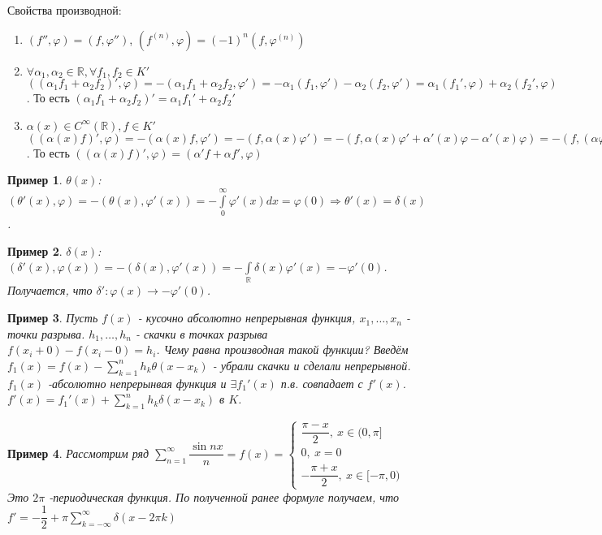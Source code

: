 \documentclass[9pt, a4paper]{article}
\newtheorem*{sample}{Пример}
\begin{document}
			Свойства производной:
			\begin{enumerate}
				\item $(f'', \varphi) = (f, \varphi'')$, $(f^{(n)}, \varphi) = (-1)^n(f, \varphi^{(n)})$
				\item $\forall \alpha_1, \alpha_2 \in \mathbb{R}, \forall f_1, f_2 \in K'$ $((\alpha_1f_1 + \alpha_2f_2)', \varphi) = -(\alpha_1f_1 + \alpha_2f_2, \varphi') = -\alpha_1(f_1, \varphi') - \alpha_2(f_2, \varphi') = \alpha_1(f_1', \varphi) + \alpha_2(f_2', \varphi)$. То есть $(\alpha_1f_1 + \alpha_2f_2)' = \alpha_1 f_1' + \alpha_2 f_2'$
				\item $\alpha(x) \in C^\infty (\mathbb{R}), f \in K'$ $((\alpha(x) f)', \varphi) = - (\alpha(x)f, \varphi') = -(f, \alpha(x) \varphi') = - (f, \alpha(x) \varphi' + \alpha'(x)\varphi - \alpha'(x) \varphi) = -(f, (\alpha \varphi)') + (f, \alpha'\varphi) = (f', \alpha \varphi) + (\alpha' f, \varphi) = (\alpha f'+ \alpha' f, \varphi), \forall \varphi \in K$. То есть $((\alpha(x)f)', \varphi) = (\alpha'f+\alpha f', \varphi)$
			\end{enumerate}
			\begin{sample}
				$\theta(x)$: $(\theta'(x), \varphi) = -(\theta(x), \varphi'(x)) = -\int\limits_0^{\infty} \varphi'(x) dx = \varphi(0) \Rightarrow \theta'(x) = \delta(x)$.
			\end{sample}
			\begin{sample}
				$\delta(x)$: $(\delta'(x), \varphi(x)) = - (\delta(x), \varphi'(x)) = - \int\limits_{\mathbb{R}} \delta(x) \varphi'(x) = - \varphi'(0)$. Получается, что $\delta': \varphi(x)  \to -\varphi'(0)$.
			\end{sample}
			\begin{sample}
				Пусть $f(x)$ - кусочно абсолютно непрерывная функция, $x_1, \dots, x_n$ - точки разрыва. $h_1, \dots, h_n$ - скачки в точках разрыва $f(x_i+0) - f(x_i-0) = h_i$. Чему равна производная такой функции? \newline
				Введём $f_1(x) = f(x) - \sum\limits_{k=1}^{n} h_k \theta(x-x_k)$ - убрали скачки и сделали непрерывной. $f_1(x)$ -абсолютно непрерынвая функция и $\exists f_1'(x)$ п.в. совпадает с $f'(x)$.
				$f'(x) = f_1'(x) + \sum\limits_{k=1}^n h_k \delta(x-x_k)$ в $K$.
			\end{sample}
			\begin{sample}
				Рассмотрим ряд $\sum\limits_{n=1}^{\infty} \dfrac{\sin{nx}}{n} = f(x) = \begin{cases}
					\dfrac{\pi - x}{2}, \ x\in (0, \pi]\\
					0,\ x = 0\\
					-\dfrac{\pi+x}{2}, \ x \in [ - \pi, 0)
				\end{cases}$ Это $2\pi$ -периодическая функция. По полученной ранее формуле получаем, что $f' = -\dfrac{1}{2} + \pi \sum\limits_{k=-\infty}^{\infty} \delta(x - 2\pi k)$
			\end{sample}
\end{document}
